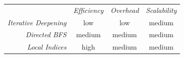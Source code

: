 \begin{center}
\begin{tabular}{rccc}
\multicolumn{1}{r}{} &
\multicolumn{1}{c}{\emph{Efficiency}} &
\multicolumn{1}{c}{\emph{Overhead}} &
\multicolumn{1}{c}{\emph{Scalability}}
\\
\cline{2-4}
\emph{Iterative Deepening} &
low &
low &
% 
medium \\
\emph{Directed BFS} &
medium &
medium &
medium \\
\emph{Local Indices} &
high &
medium &
medium \\
\end{tabular}
\end{center}

